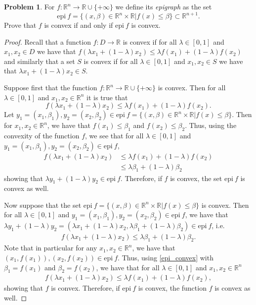 \documentclass[12pt]{article}
\theoremstyle{definition}
\newtheorem{problem}{Problem}
\begin{document}
\begin{problem}
  For $f: \mathbb{R}^n \to \mathbb{R} \cup \{+\infty\}$ we define its \textit{epigraph}
  as the set
  \[
   \text{epi}\ f = \{(x, \beta) \in \mathbb{R}^n \times \mathbb{R} | f(x) \leq \beta \} \subset \mathbb{R}^{n+1}.
  \]
  Prove that $f$ is convex if and only if $\text{epi}\ f$ is convex.
\end{problem}

\begin{proof}
  Recall that a function $f: D \to \mathbb{R}$ is convex if for all $\lambda \in [0, 1]$ and $x_1, x_2 \in D$
  we have that $f(\lambda x_1 + (1-\lambda)x_2) \leq \lambda f(x_1) + (1-\lambda)f(x_2)$
  and similarly that a set $S$ is convex if for all $\lambda \in [0, 1]$ and $x_1, x_2 \in S$
  we have that $\lambda x_1 + (1- \lambda) x_2 \in S$.

  Suppose first that the function $f: \mathbb{R}^n \to \mathbb{R} \cup \{+\infty\}$ is convex.
  Then for all $\lambda \in [0, 1]$ and $x_1, x_2 \in \mathbb{R}^n$ it is true that
  $$f(\lambda x_1 + (1-\lambda)x_2) \leq \lambda f(x_1) + (1-\lambda)f(x_2).$$
  Let $y_1 = (x_1, \beta_1), y_2 = (x_2, \beta_2) \in \text{epi}\ f = \{(x, \beta) \in \mathbb{R}^n \times \mathbb{R} | f(x) \leq \beta \}$.
  Then for $x_1, x_2 \in \mathbb{R}^n$, we have that $f(x_1) \leq \beta_1$ and
  $f(x_2) \leq \beta_2$. Thus, using the convexity of the function $f$, we see that for all $\lambda \in [0,1]$ and
  $y_1 = (x_1, \beta_1), y_2 = (x_2, \beta_2) \in \text{epi}\ f$,
  \begin{align*}
    f(\lambda x_1 + (1-\lambda) x_2)
    &\leq \lambda f(x_1) + (1-\lambda)f(x_2) \\
    &\leq \lambda \beta_1 + (1-\lambda) \beta_2
  \end{align*}
  showing that $\lambda y_1 + (1-\lambda) y_2 \in \text{epi}\ f$. Therefore, if
  $f$ is convex, the set $\text{epi}\ f$ is convex as well.

  Now suppose that the set $\text{epi}\ f= \{(x, \beta) \in \mathbb{R}^n \times \mathbb{R} | f(x) \leq \beta \}$
  is convex. Then for all $\lambda \in [0, 1]$ and
  $y_1 = (x_1, \beta_1), y_2 = (x_2, \beta_2) \in \text{epi}\ f$, we have that
  $\lambda y_1 + (1-\lambda) y_2 = (\lambda x_1 + (1-\lambda)x_2, \lambda \beta_1 + (1-\lambda)\beta_2) \in \text{epi}\ f$, i.e.\
  \begin{align}\label{epi_convex}
    f(\lambda x_1 + (1-\lambda)x_2) \leq \lambda \beta_1 + (1-\lambda) \beta_2.
  \end{align}
  Note that in particular for any $x_1, x_2 \in \mathbb{R}^n$, we have that
  $(x_1, f(x_1)), (x_2, f(x_2)) \in \text{epi}\ f$.
  Thus, using \eqref{epi_convex} with $\beta_1 = f(x_1)$ and $\beta_2 = f(x_2)$,
  we have that for all $\lambda \in [0,1]$ and $x_1, x_2 \in \mathbb{R}^n$
  \begin{align*}
    f(\lambda x_1 + (1-\lambda)x_2) \leq \lambda f(x_1) + (1-\lambda) f(x_2),
  \end{align*}
  showing that $f$ is convex.
  Therefore, if $\text{epi}\ f$ is convex, the function $f$ is convex as well.

\end{proof}
\end{document}
